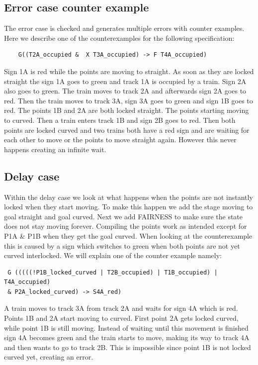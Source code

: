 \documentclass[a4paper]{article}
\begin{document}
	\subsection{Error case counter example}
	The error case is checked and generates multiple errors with counter examples. Here we describe one of the counterexamples for the following specification: 
	\begin{lstlisting}
	G((T2A_occupied &  X T3A_occupied) -> F T4A_occupied)
	\end{lstlisting}
	Sign 1A is red while the points are moving to straight. As soon as they are locked straight the sign 1A goes to green and track 1A is occupied by a train. Sign 2A also goes to green. The train moves to track 2A and afterwards sign 2A goes to red. Then the train moves to track 3A, sign 3A goes to green and sign 1B goes to red. The points 1B and 2A are both locked straight. The points starting moving to curved. Then a train enters track 1B and sign 2B goes to red. Then both points are locked curved and two trains both have a red sign and are waiting for each other to move or the points to move straight again. However this never happens creating an infinite wait.	
	
	\subsection{Delay case}
	Within the delay case we look at what happens when the points are not instantly locked when they start moving. To make this happen we add the stage moving to goal straight and goal curved.
	Next we add FAIRNESS to make sure the state does not stay moving forever.
	Compiling the points work as intended except for P1A \& P1B when they get the goal curved. When looking at the counterexample this is caused by a sign which switches to green when both points are not yet curved interlocked.
	We will explain one of the counter example namely:
\begin{lstlisting}
 G (((((!P1B_locked_curved | T2B_occupied) | T1B_occupied) | T4A_occupied)
 & P2A_locked_curved) -> S4A_red)
\end{lstlisting}
	A train moves to track 3A from track 2A and waits for sign 4A which is red. Points 1B and 2A start moving to curved. First point 2A gets locked curved, while point 1B is still moving. Instead of waiting until this movement is finished sign 4A becomes green and the train starts to move, making its way to track 4A and then wants to go to track 2B. This is impossible since point 1B is not locked curved yet, creating an error. 
	
\end{document}
